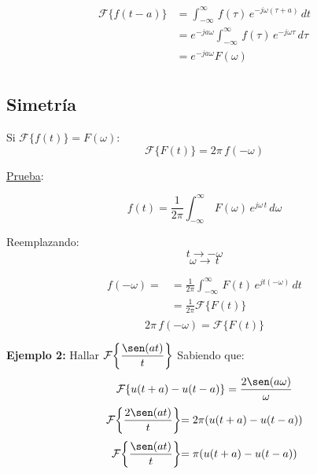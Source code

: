 \begin{equation*}
\begin{split}
    \mathcal{F}\{f(t-a)\}
        &=\int_{-\infty}^\infty\,f(\tau)\,e^{-j\omega(\tau+a)}\,dt\\
        &=e^{-ja\omega}\int_{-\infty}^\infty\,f(\tau)\,e^{-j\omega\tau}\,d\tau\\
        &=e^{-ja\omega}F(\omega)\\
\end{split}
\end{equation*}

\subsection{Simetría}
Si $\mathcal{F}\{f(t)\}=F(\omega)$:
\begin{equation}
    \mathcal{F}\{F(t)\}=2\pi\,f(-\omega)
\end{equation}

\underline{Prueba}:

\begin{equation*}
    f(t)=\frac{1}{2\pi}\int_{-\infty}^\infty\,F(\omega)\,e^{j\omega\,t}\,d\omega
\end{equation*}

Reemplazando:
\begin{equation*}
    t\to-\omega
\end{equation*}
\begin{equation*}
    \omega\to\,t
\end{equation*}

\begin{equation*}
\begin{split}
    f(-\omega)=
        &=\frac{1}{2\pi}\int_{-\infty}^\infty\,F(t)\,e^{jt(-\omega)}\,dt\\
        &=\frac{1}{2\pi}\mathcal{F}\{F(t)\}\\
\end{split}
\end{equation*}
\begin{equation*}
    2\pi\,f(-\omega)=\mathcal{F}\{F(t)\}
\end{equation*}

\textbf{Ejemplo 2:} Hallar $\mathcal{F}\biggl\{\dfrac{\sen(at)}{t}\biggl\}$
Sabiendo que:
\begin{equation*}
    \mathcal{F}\{u(t+a)-u(t-a)\}=\dfrac{2\sen(a\omega)}{\omega}
\end{equation*}
\begin{equation*}
    \mathcal{F}\biggl\{\dfrac{2\sen(at)}{t}\biggl\}=2\pi(u(t+a)-u(t-a))
\end{equation*}
\begin{equation}
    \mathcal{F}\biggl\{\dfrac{\sen(at)}{t}\biggl\}=\pi(u(t+a)-u(t-a))
\end{equation}

